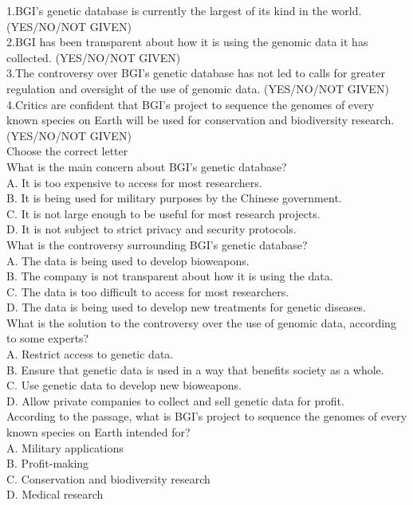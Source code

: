 \documentclass[10pt, a4paper, oneside]{article}
\begin{document}
\begin{spacing}{2.0}
1.BGI's genetic database is currently the largest of its kind in the world. (YES/NO/NOT GIVEN)\\
2.BGI has been transparent about how it is using the genomic data it has collected. (YES/NO/NOT GIVEN)\\
3.The controversy over BGI's genetic database has not led to calls for greater regulation and oversight of the use of genomic data. (YES/NO/NOT GIVEN)\\
4.Critics are confident that BGI's project to sequence the genomes of every known species on Earth will be used for conservation and biodiversity research. (YES/NO/NOT GIVEN)\\

Choose the correct letter\\

What is the main concern about BGI's genetic database?\\
A. It is too expensive to access for most researchers.\\
B. It is being used for military purposes by the Chinese government.\\
C. It is not large enough to be useful for most research projects.\\
D. It is not subject to strict privacy and security protocols.\\

What is the controversy surrounding BGI's genetic database?\\
A. The data is being used to develop bioweapons.\\
B. The company is not transparent about how it is using the data.\\
C. The data is too difficult to access for most researchers.\\
D. The data is being used to develop new treatments for genetic diseases.\\

What is the solution to the controversy over the use of genomic data, according to some experts?\\
A. Restrict access to genetic data.\\
B. Ensure that genetic data is used in a way that benefits society as a whole.\\
C. Use genetic data to develop new bioweapons.\\
D. Allow private companies to collect and sell genetic data for profit.\\

According to the passage, what is BGI's project to sequence the genomes of every known species on Earth intended for?\\
A. Military applications\\
B. Profit-making\\
C. Conservation and biodiversity research\\
D. Medical research\\



\end{spacing}
\end{document}

